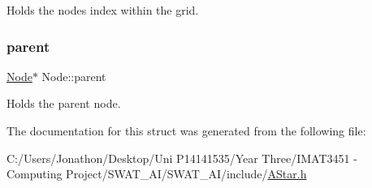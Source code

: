 Holds the nodes index within the grid. 

\mbox{\label{struct_node_ad8184598cdea70e4bbdfd76f2b0f9e85}} 
\subsubsection{\texorpdfstring{parent}{parent}}
{\footnotesize\ttfamily \hyperlink{struct_node}{Node}$\ast$ Node\+::parent}



Holds the parent node. 



The documentation for this struct was generated from the following file\+:\begin{DoxyCompactItemize}
\item 
C\+:/\+Users/\+Jonathon/\+Desktop/\+Uni P14141535/\+Year Three/\+I\+M\+A\+T3451 -\/ Computing Project/\+S\+W\+A\+T\+\_\+\+A\+I/\+S\+W\+A\+T\+\_\+\+A\+I/include/\hyperlink{_a_star_8h}{A\+Star.\+h}\end{DoxyCompactItemize}
